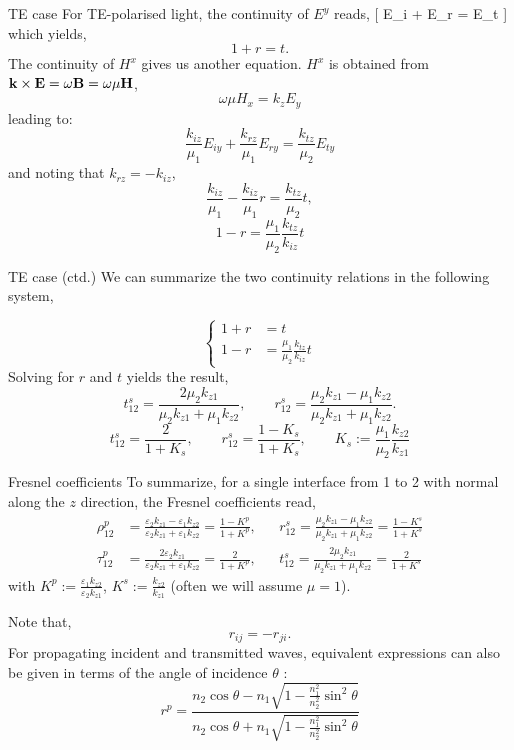 \documentclass{article}
\begin{document}
\begin{frame}{TE case}
\protect\hypertarget{te-case}{}
For TE-polarised light, the continuity of \(E^y\) reads, {[} E\_i + E\_r
= E\_t {]} which yields, \[
  1+r =t.
\] The continuity of \(H^x\) gives us another equation. \(H^x\) is
obtained from \(\mathbf{k}\times\mathbf{E} = \omega\mathbf{B} = \omega\mu\mathbf{H}\), \[
\omega\mu H_x = k_z E_y
\] leading to: \[
\frac{k_{iz}}{\mu_1}E_{iy} + \frac{k_{rz}}{\mu_1}E_{ry} = \frac{k_{tz}}{\mu_2}E_{ty}
\] and noting that \(k_{rz} = -k_{iz}\), \[
\frac{k_{iz}}{\mu_1} - \frac{k_{iz}}{\mu_1}r = \frac{k_{tz}}{\mu_2}t,
\] \[
1 - r = \frac{\mu_1}{\mu_2}\frac{k_{tz}}{k_{iz}}t
\]
\end{frame}

\begin{frame}{TE case (ctd.)}
\protect\hypertarget{te-case-ctd.}{}
We can summarize the two continuity relations in the following system,

\[\left\{
\begin{aligned}
1 + r &= t\\
1 - r &= \frac{\mu_1}{\mu_2}\frac{k_{tz}}{k_{iz}}t
\end{aligned}\right.
\] Solving for \(r\) and \(t\) yields the result, \[
t_{12}^s=\frac{2\mu_2 k_{z1}}{\mu_2 k_{z1}+\mu_1k_{z2}},\qquad r_{12}^s=\frac{\mu_2 k_{z1}-\mu_1k_{z2}}{\mu_2 k_{z1}+\mu_1k_{z2}}.
\] \[
t_{12}^s=\frac{2}{1+K_s},\qquad r_{12}^s=\frac{1 - K_s}{1 + K_s},\qquad K_s:=\frac{\mu_1}{\mu_2}\frac{k_{z2}}{k_{z1}}
\]
\end{frame}

\begin{frame}{Fresnel coefficients}
\protect\hypertarget{fresnel-coefficients}{}
To summarize, for a single interface from 1 to 2 with normal along the
\(z\) direction, the Fresnel coefficients read, \[
    \begin{aligned}
    \rho_{12}^p & =\frac{\varepsilon_2 k_{z1}-\varepsilon_1k_{z2}}{\varepsilon_2 k_{z1}+\varepsilon_1k_{z2}} = \frac{1-K^p}{1+K^p},%
    & {}& r_{12}^s=\frac{\mu_2 k_{z1}-\mu_1k_{z2}}{\mu_2 k_{z1}+\mu_1k_{z2}} = \frac{1-K^s}{1+K^s}\\
    \tau_{12}^p &=\frac{2\varepsilon_2 k_{z1}}{\varepsilon_2 k_{z1}+\varepsilon_1k_{z2}} = \frac{2}{1+K^p},%
    &{}& t_{12}^s=\frac{2\mu_2 k_{z1}}{\mu_2 k_{z1}+\mu_1k_{z2}} = \frac{2}{1+K^s}
    \end{aligned}
\] with \(K^p:= \frac{\varepsilon_1 k_{z2}}{\varepsilon_2 k_{z1}}\),
\(K^s:= \frac{ k_{z2}}{ k_{z1}}\) (often we will assume \(\mu=1\)).

Note that, \[
    r_{ij}=-r_{ji}.
\] For propagating incident and transmitted waves, equivalent
expressions can also be given in terms of the angle of incidence
\(\theta\) : \[
r^{p}=\frac{n_{2} \cos \theta-n_{1} \sqrt{1-\frac{n_{1}^{2}}{n_{2}^{2}} \sin ^{2} \theta}}{n_{2} \cos \theta+n_{1} \sqrt{1-\frac{n_{1}^{2}}{n_{2}^{2}} \sin ^{2} \theta}} 
\]
\end{frame}
\end{document}
